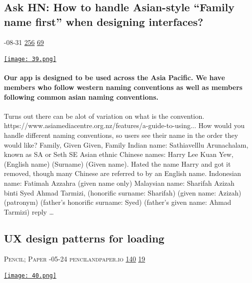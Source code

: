 \documentclass[10pt,a4paper]{article}
\begin{document}
\begin{multicols}{2}
\begin{minipage}{\linewidth}
\subsection{Ask HN: How to handle Asian-style “Family name first” when designing interfaces?}
\textsc{\footnotesize
{\scriptsize\faCalendar}-08-31 
{\scriptsize\faThumbsOUp}\space 
\href{}{256} 
{\scriptsize\faComments}\space 
\href{}{69} 
}
\par\medskip\noindent
\href{https://news.ycombinator.com/item?id=37332126\&utm\_source=hackernewsletter\&utm\_medium=email\&utm\_term=design}{
    \texttt{[image: 39.png]}
}
\end{minipage}
\paragraph{}
\textbf{Our app is designed to be used across the Asia Pacific.
We have members who follow western naming conventions as well as members following common asian naming conventions.}
\paragraph{}

Turns out there can be alot of variation on what is the convention.
https://www.asiamediacentre.org.nz/features/a-guide-to-using...
How would you handle different naming conventions, so users see their name in the order they would like?
Family, Given
Given, Family
Indian name: Sathiavelllu Arunachalam, known as SA or Seth
SE Asian ethnic Chinese names: Harry Lee Kuan Yew, (English name) (Surname) (Given name). Hated the name Harry and got it removed, though many Chinese are referred to by an English name.
Indonesian name: Fatimah Azzahra (given name only)
Malaysian name: Sharifah Azizah binti Syed Ahmad Tarmizi, (honorific surname: Sharifah) (given name: Azizah) (patronym) (father's honorific surname: Syed) (father's given name: Ahmad Tarmizi)
reply
\dots\par
\noindent\begin{minipage}{\linewidth}
\medskip
\subsection{UX design patterns for loading}
\textsc{\footnotesize
{\scriptsize\faUser}\space 
Pencil; Paper 
{\scriptsize\faCalendar}-05-24 
{\scriptsize\faGlobe}\space 
pencilandpaper.io 
{\scriptsize\faThumbsOUp}\space 
\href{http://news.ycombinator.com/item?id=37274610\&utm\_term=comment}{140} 
{\scriptsize\faComments}\space 
\href{http://news.ycombinator.com/item?id=37274610\&utm\_term=comment}{19} 
}
\par\medskip\noindent
\href{https://pencilandpaper.io/articles/ux-pattern-analysis-loading-feedback/?utm\_source=hackernewsletter\&utm\_medium=email\&utm\_term=design}{
    \texttt{[image: 40.png]}
}
\end{minipage}

\end{multicols}
\end{document}
